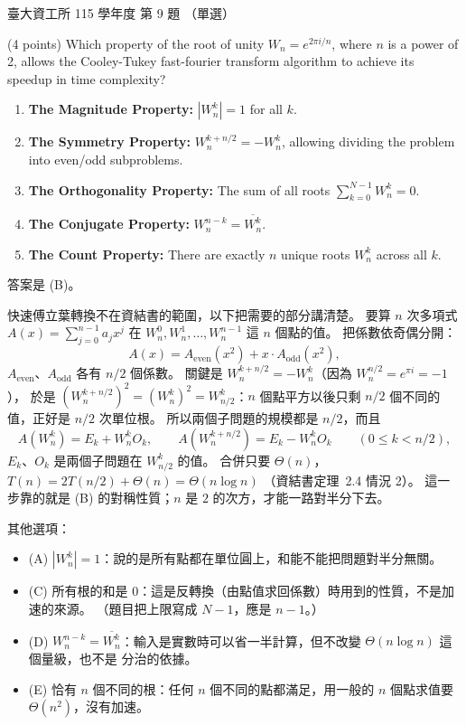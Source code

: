 \begin{pastexam}[label={px:ntu-115-dsa-09}]{臺大資工所 115 學年度 第 9 題}
（單選）

(4 points) Which property of the root of unity $W_n=e^{2\pi i/n}$, where $n$ is a power of 2, allows the Cooley-Tukey fast-fourier transform algorithm to achieve its speedup in time complexity?
\begin{enumerate}[label=(\Alph*)]
\item \textbf{The Magnitude Property:} $|W_n^k|=1$ for all $k$.
\item \textbf{The Symmetry Property:} $W_n^{k+n/2}=-W_n^k$, allowing dividing the problem into even/odd subproblems.
\item \textbf{The Orthogonality Property:} The sum of all roots $\sum_{k=0}^{N-1}W_n^k=0$.
\item \textbf{The Conjugate Property:} $W_n^{n-k}=\overline{W_n^k}$.
\item \textbf{The Count Property:} There are exactly $n$ unique roots $W_n^k$ across all $k$.
\end{enumerate}
\end{pastexam}

\begin{pastsoln}
答案是 (B)。

快速傅立葉轉換不在資結書的範圍，以下把需要的部分講清楚。 要算 $n$ 次多項式
$A(x) = \sum_{j=0}^{n-1} a_j x^j$ 在 $W_n^0, W_n^1, \ldots, W_n^{n-1}$ 這 $n$ 個點的值。 把係數依奇偶分開：
\[
A(x) = A_{\text{even}}(x^2) + x \cdot A_{\text{odd}}(x^2),
\]
$A_{\text{even}}$、$A_{\text{odd}}$ 各有 $n/2$ 個係數。 關鍵是 $W_n^{k + n/2} = -W_n^k$（因為 $W_n^{n/2} = e^{\pi i} = -1$），
於是 $(W_n^{k + n/2})^2 = (W_n^k)^2 = W_{n/2}^k$：$n$ 個點平方以後只剩 $n/2$ 個不同的值，正好是 $n/2$ 次單位根。
所以兩個子問題的規模都是 $n/2$，而且
\[
A(W_n^k) = E_k + W_n^k O_k, \qquad A(W_n^{k + n/2}) = E_k - W_n^k O_k \qquad (0 \le k < n/2),
\]
$E_k$、$O_k$ 是兩個子問題在 $W_{n/2}^k$ 的值。 合併只要 $\Theta(n)$，$T(n) = 2T(n/2) + \Theta(n) = \Theta(n \log n)$
（資結書定理~2.4 情況 2）。 這一步靠的就是 (B) 的對稱性質；$n$ 是 $2$ 的次方，才能一路對半分下去。

其他選項：
\begin{itemize}
\item (A) $|W_n^k| = 1$：說的是所有點都在單位圓上，和能不能把問題對半分無關。
\item (C) 所有根的和是 $0$：這是反轉換（由點值求回係數）時用到的性質，不是加速的來源。 （題目把上限寫成
$N - 1$，應是 $n - 1$。）
\item (D) $W_n^{n-k} = \overline{W_n^k}$：輸入是實數時可以省一半計算，但不改變 $\Theta(n \log n)$ 這個量級，也不是
分治的依據。
\item (E) 恰有 $n$ 個不同的根：任何 $n$ 個不同的點都滿足，用一般的 $n$ 個點求值要 $\Theta(n^2)$，沒有加速。
\end{itemize}
\end{pastsoln}
